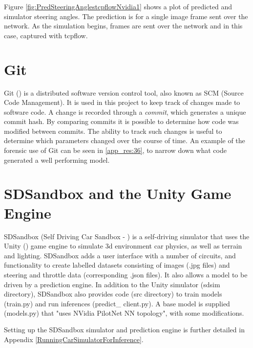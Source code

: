 Figure \ref{fig:PredSteeringAnglestcpflowNvidia1} shows a plot of predicted and simulator steering angles. The prediction is for a single image frame sent over the network. As the simulation begins, frames are sent over the network and in this case, captured with tcpflow.

\section{Git}
Git (\cite{chacon2014pro}) is a distributed software version control tool, also known as SCM (Source Code Management). It is used in this project to keep track of changes made to software code. A change is recorded through a \textit{commit}, which generates a unique commit hash. By comparing commits it is possible to determine how code was modified between commits. The ability to track such changes is useful to determine which parameters changed over the course of time. An example of the forensic use of Git can be seen in \ref{app_res:36}, to narrow down what code generated a well performing model.


\section{SDSandbox and the Unity Game Engine}
\label{met:sdsandboxAndUnity}
SDSandbox (Self Driving Car Sandbox - \cite{SDSandboxSim}) is a self-driving simulator that uses the Unity (\cite{haas2014history}) game engine to simulate 3d environment car physics, as well as terrain and lighting. SDSandbox adds a user interface with a number of circuits, and functionality to create labelled datasets consisting of images (.jpg files) and steering and throttle data (corresponding .json files). It also allows a model to be driven by a prediction engine. In addition to the Unity simulator (sdsim directory), SDSandbox also provides code (src directory) to train models (train.py) and run inferences (predict\_ client.py). A base model is supplied (models.py) that "uses NVidia PilotNet NN topology", with some modifications.  
  
Setting up the SDSandbox simulator and prediction engine is further detailed in Appendix \ref{RunningCarSimulatorForInference}.

